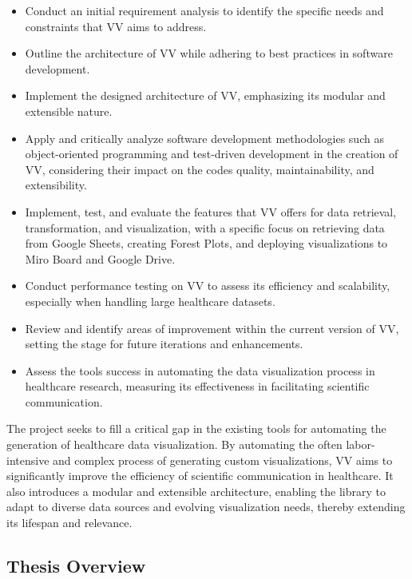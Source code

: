 \begin{itemize}
\item
  Conduct an initial requirement analysis to identify the specific needs
  and constraints that VV aims to address.
\item
  Outline the architecture of VV while adhering to best practices in
  software development.
\item
  Implement the designed architecture of VV, emphasizing its modular and
  extensible nature.
\item
  Apply and critically analyze software development methodologies such
  as object-oriented programming and test-driven development in the
  creation of VV, considering their impact on the code\textquotesingle s
  quality, maintainability, and extensibility.
\item
  Implement, test, and evaluate the features that VV offers for data
  retrieval, transformation, and visualization, with a specific focus on
  retrieving data from Google Sheets, creating Forest Plots, and
  deploying visualizations to Miro Board and Google Drive.
\item
  Conduct performance testing on VV to assess its efficiency and
  scalability, especially when handling large healthcare datasets.
\item
  Review and identify areas of improvement within the current version of
  VV, setting the stage for future iterations and enhancements.
\item
  Assess the tool\textquotesingle s success in automating the data
  visualization process in healthcare research, measuring its
  effectiveness in facilitating scientific communication.
\end{itemize}

The project seeks to fill a critical gap in the existing tools for
automating the generation of healthcare data visualization. By
automating the often labor-intensive and complex process of generating
custom visualizations, VV aims to significantly improve the efficiency
of scientific communication in healthcare. It also introduces a modular
and extensible architecture, enabling the library to adapt to diverse
data sources and evolving visualization needs, thereby extending its
lifespan and relevance.

\subsection{Thesis Overview}\label{thesis-overview}

